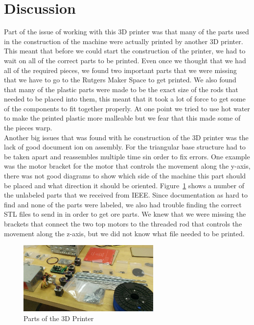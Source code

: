 \documentclass[12pt,twocolumn]{article}
\begin{document}
\section{Discussion}
Part of the issue of working with this 3D printer was that many of the parts used in the construction of the machine were actually printed by another 3D printer. This meant that before we could start the construction of the printer, we had to wait on all of the correct parts to be printed. Even once we thought that we had all of the required pieces, we found two important parts that we were missing that we have to go to the Rutgers Maker Space to get printed. We also found that many of the plastic parts were made to be the exact size of the rods that needed to be placed into them, this meant that it took a lot of force to get some of the components to fit together properly. At one point we tried to use hot water to make the printed plastic more malleable but we fear that this made some of the pieces warp. \\
\indent Another big issues that was found with he construction of the 3D printer was the lack of good document ion on assembly. For the triangular base structure had to be taken apart and reassembles multiple time sin order to fix errors. One example was the motor bracket for the motor that controls the movement along the y-axis, there was not good diagrams to show which side of the machine this part should be placed and what direction it should be oriented. Figure~\ref{parts} shows a number of the unlabeled parts that we received from IEEE. Since documentation as hard to find and none of the parts were labeled, we also had trouble finding the correct STL files to send in in order to get ore parts. We knew that we were missing the brackets that connect the two top motors to the threaded rod that controls the movement along the z-axis, but we did not know what file needed to be printed.\\
\begin{figure}[H]
\centering
\includegraphics[width=70mm]{WP_20130223_002.jpg}
\caption{Parts of the 3D Printer}
\label{parts}
\end{figure}
\end{document}

